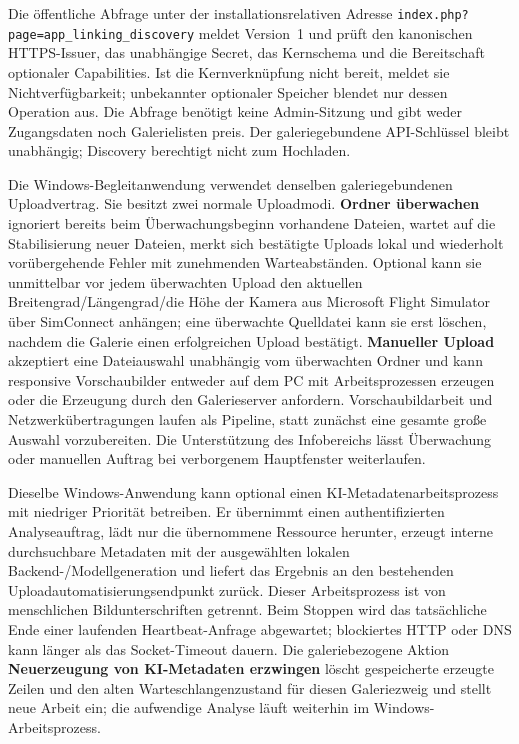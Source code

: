 \documentclass[11pt,a4paper]{article}
\newcommand{\ui}[1]{\textbf{#1}}
\begin{document}
Die öffentliche Abfrage unter der installationsrelativen Adresse
\texttt{index.php?page=app\_linking\_discovery} meldet Version~1 und prüft
den kanonischen HTTPS-Issuer, das unabhängige Secret, das Kernschema und die
Bereitschaft optionaler Capabilities. Ist die Kernverknüpfung nicht bereit,
meldet sie Nichtverfügbarkeit; unbekannter optionaler Speicher blendet nur
dessen Operation aus. Die Abfrage benötigt keine Admin-Sitzung und gibt weder
Zugangsdaten noch Galerielisten preis. Der galeriegebundene API-Schlüssel bleibt
unabhängig; Discovery berechtigt nicht zum Hochladen.

Die Windows-Begleitanwendung verwendet denselben galeriegebundenen
Uploadvertrag. Sie besitzt zwei normale Uploadmodi. \ui{Ordner überwachen}
ignoriert bereits beim Überwachungsbeginn vorhandene Dateien, wartet auf die
Stabilisierung neuer Dateien, merkt sich bestätigte Uploads lokal und wiederholt
vorübergehende Fehler mit zunehmenden Warteabständen. Optional kann sie
unmittelbar vor jedem überwachten Upload den aktuellen
Breitengrad/Längengrad/die Höhe der Kamera aus Microsoft Flight Simulator über
SimConnect anhängen; eine überwachte Quelldatei kann sie erst löschen, nachdem
die Galerie einen erfolgreichen Upload bestätigt. \ui{Manueller Upload}
akzeptiert eine Dateiauswahl unabhängig vom überwachten Ordner und kann
responsive Vorschaubilder entweder auf dem PC mit Arbeitsprozessen erzeugen oder
die Erzeugung durch den Galerieserver anfordern. Vorschaubildarbeit und
Netzwerkübertragungen laufen als Pipeline, statt zunächst eine gesamte große
Auswahl vorzubereiten. Die Unterstützung des Infobereichs lässt Überwachung oder
manuellen Auftrag bei verborgenem Hauptfenster weiterlaufen.

Dieselbe Windows-Anwendung kann optional einen KI-Metadatenarbeitsprozess mit
niedriger Priorität betreiben. Er übernimmt einen authentifizierten
Analyseauftrag, lädt nur die übernommene Ressource herunter, erzeugt interne
durchsuchbare Metadaten mit der ausgewählten lokalen Backend-/Modellgeneration
und liefert das Ergebnis an den bestehenden Uploadautomatisierungsendpunkt
zurück. Dieser Arbeitsprozess ist von menschlichen Bildunterschriften getrennt.
Beim Stoppen wird das tatsächliche Ende einer laufenden Heartbeat-Anfrage
abgewartet; blockiertes HTTP oder DNS kann länger als das Socket-Timeout dauern.
Die galeriebezogene Aktion \ui{Neuerzeugung von KI-Metadaten erzwingen} löscht
gespeicherte erzeugte Zeilen und den alten Warteschlangenzustand für diesen
Galeriezweig und stellt neue Arbeit ein; die aufwendige Analyse läuft weiterhin
im Windows-Arbeitsprozess.
\end{document}
